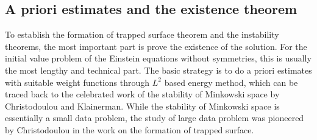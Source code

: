 \documentclass[11pt,reqno]{amsart}
\theoremstyle{definition}
\numberwithin{equation}{section}
\begin{document}
\subsection{A priori estimates and the existence theorem}\label{existencesection}

To establish the formation of trapped surface theorem and the instability theorems, the most important part is prove the existence of the solution. For the initial value problem of the Einstein equations without symmetries, this is usually the most lengthy and technical part. The basic strategy is to do a priori estimates with suitable weight functions through $L^2$ based energy method, which can be traced back to the celebrated work \cite{Ch-K} of the stability of Minkowski space by Christodoulou and Klainerman. While the stability of Minkowski space is essentially a small data problem, the study of large data problem was pioneered by Christodoulou in the work \cite{Chr} on the formation of trapped surface.
\end{document}
